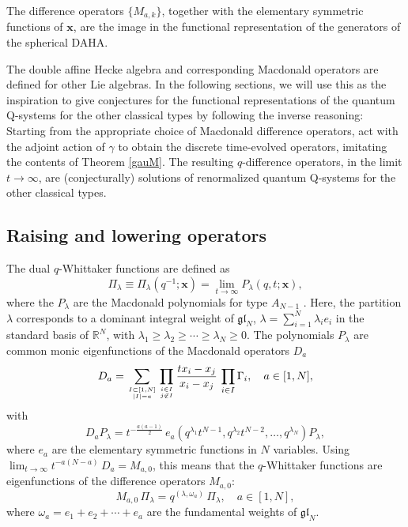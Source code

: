 \documentclass[12pt]{amsart}
\newcommand{\gl}{{\mathfrak{gl}}}
\newcommand{\R}{{\mathbb R}}
\newcommand{\bx}{{\mathbf x}}
\numberwithin{equation}{section}
\numberwithin{table}{section}
\begin{document}
The difference operators $\{M_{a,k}\}$, together with the elementary symmetric functions of $\bx$, are the image in the functional representation of the generators of the spherical DAHA.

\bigskip
The double affine Hecke algebra and  corresponding Macdonald operators are defined for  other Lie algebras.
In the following sections, we will use this as the inspiration to give conjectures for the functional representations of the quantum Q-systems for the other
classical types by following the inverse reasoning: Starting from the appropriate choice of Macdonald difference operators, act with the adjoint action of $\gamma$ to obtain the discrete
time-evolved operators, imitating the contents of Theorem \ref{gauM}. The resulting $q$-difference operators, in the limit $t\to\infty$, are  (conjecturally) solutions
of renormalized quantum Q-systems for the other classical types.

\subsection{Raising and lowering operators}

The dual $q$-Whittaker functions are defined as
$$\Pi_\lambda\equiv\Pi_\lambda(q^{-1};\bx)=\lim_{t\to \infty} P_\lambda (q,t;\bx),$$
where the $P_\lambda$ are the Macdonald polynomials for type $A_{N-1}$ \cite{macdo}.  Here, the partition $\lambda$ corresponds to a dominant  integral weight of $\gl_N$,
 $\lambda=\sum_{i=1}^N \lambda_i e_i$ in the standard basis of $\R^N$,
with 
$\lambda_1\geq \lambda_2 \geq \cdots \geq \lambda_N\geq 0$. 
The polynomials $P_\lambda$ 
are common monic
eigenfunctions of the Macdonald operators $D_a$
\begin{equation}\label{macdopA}
D_a=\sum_{I\subset [1,N]\atop |I|=a} 
\prod_{i\in I\atop j\not\in I} \frac{t x_i-x_j}{x_i-x_j}\, \prod_{i\in I} \Gamma_i ,  \quad a\in [1,N],
\end{equation}
with 
$$D_a P_\lambda = t^{-\frac{a(a-1)}{2}}\, e_a(q^{\lambda_1} t^{N-1}, q^{\lambda_2} t^{N-2},\ldots, q^{\lambda_N} )P_\lambda,$$
where $e_a$ are the elementary symmetric functions in $N$ variables. 
Using $\displaystyle\lim_{t\to\infty} t^{-a(N-a)}\, D_a=M_{a,0}$, this means that the $q$-Whittaker functions are eigenfunctions of the difference operators $M_{a,0}$:
\begin{equation}\label{eigenAN}
M_{a,0}\, \Pi_\lambda= q^{(\lambda,\omega_a)}\, \Pi_\lambda , \quad a\in [1,N],
\end{equation}
where $\omega_a=e_1+e_2+\cdots +e_a$ are the fundamental weights of $\mathfrak{gl}_N$. 
\end{document}
